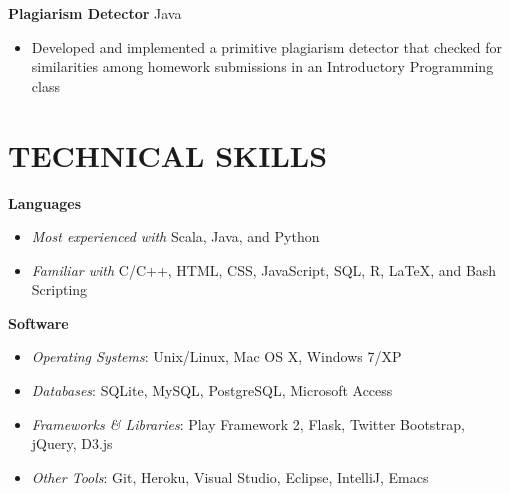 \documentclass[margin]{res}
\begin{document}
\begin{resume}
\textbf{Plagiarism Detector} \hfill Java
\begin{itemize}[leftmargin=10pt]
\item Developed and implemented a primitive plagiarism detector that checked for similarities among homework submissions in an Introductory Programming class
\end{itemize}

\section{TECHNICAL SKILLS}
\textbf{Languages}
\begin{itemize}[leftmargin=10pt]
\item \textit{Most experienced with} Scala, Java, and Python
\item \textit{Familiar with} C/C++, HTML, CSS, JavaScript, SQL, R, \LaTeX{}, and Bash Scripting
\end{itemize}

\textbf{Software}
\begin{itemize}[leftmargin=10pt]
\item \textit{Operating Systems}: Unix/Linux, Mac OS X, Windows 7/XP
\item \textit{Databases}: SQLite, MySQL, PostgreSQL, Microsoft Access
\item \textit{Frameworks \& Libraries}: Play Framework 2, Flask, Twitter Bootstrap, jQuery, D3.js
\item \textit{Other Tools}: Git, Heroku, Visual Studio, Eclipse, IntelliJ, Emacs
\end{itemize}

\end{resume}
\end{document}
